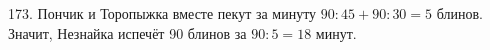 173. Пончик и Торопыжка вместе пекут за минуту $90:45+90:30=5$ блинов. Значит, Незнайка испечёт 90 блинов за $90:5=18$ минут.\\
